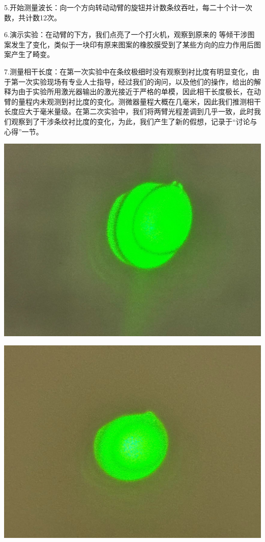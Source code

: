 \documentclass[10pt]{ctexart}
\begin{document}
5.开始测量波长：向一个方向转动动臂的旋钮并计数条纹吞吐，每二十个计一次数，共计数12次。

6.演示实验：在动臂的下方，我们点亮了一个打火机，观察到原来的 等倾干涉图案发生了变化，类似于一块印有原来图案的橡胶膜受到了某些方向的应力作用后图案产生了畸变。

7.测量相干长度：在第一次实验中在条纹极细时没有观察到衬比度有明显变化，由于第一次实验现场有专业人士指导，经过我们的询问，以及他们的操作，给出的解释为由于实验所用激光器输出的激光接近于严格的单模，因此相干长度极长，在动臂的量程内未观测到衬比度的变化。测微器量程大概在几毫米，因此我们推测相干长度应大于毫米量级。在第二次实验中，我们将两臂光程差调到几乎一致，此时我们观察到了干涉条纹衬比度的变化，为此，我们产生了新的假想，记录于“讨论与心得”一节。

\begin{minipage}{0.45\textwidth}
    \includegraphics[width=\textwidth]{清晰.jpg}
\end{minipage}
\hfill
\begin{minipage}{0.45\textwidth}
    \includegraphics[width=\textwidth]{模糊.jpg}
\end{minipage}
\end{document}
